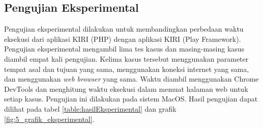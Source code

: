 \subsection{Pengujian Eksperimental}

Pengujian eksperimental dilakukan untuk membandingkan perbedaan waktu eksekusi dari aplikasi KIRI (PHP) dengan aplikasi KIRI (Play Framework). Pengujian eksperimental mengambil lima tes kasus dan masing-masing kasus diambil empat kali pengujian. Kelima kasus tersebut menggunakan parameter tempat asal dan tujuan yang sama, menggunakan koneksi internet yang sama, dan menggunakan \textit{web browser} yang sama. Waktu diambil menggunakan Chrome DevTools dan menghitung waktu eksekusi dalam memuat halaman web untuk setiap kasus. Pengujian ini dilakukan pada sistem MacOS. Hasil pengujian dapat dilihat pada tabel  \ref{table:hasilEksperimental} dan grafik \ref{fig:5_grafik_eksperimental}.
			
